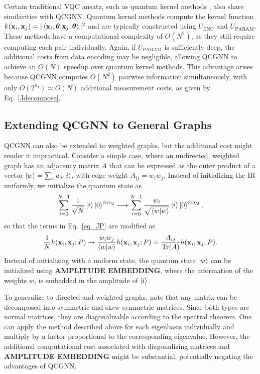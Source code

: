 \documentclass[reprint,amsmath,amssymb,prd,nofootinbib]{revtex4-2}
\DeclareMathOperator{\Tr}{Tr}
\def\xbf{\mathbf{x}}
\def\thetabf{\boldsymbol{\theta}}
\def\UENC{U_{\text{ENC}}}
\def\UPARAM{U_{\text{PARAM}}}
\begin{document}
Certain traditional VQC ansatz, such as quantum kernel methods \cite{q_kernel1,q_kernel2}, also share similarities with QCGNN. Quantum kernel methods compute the kernel function $k(\xbf_i, \xbf_j)=|\braket{\xbf_i, \thetabf|\xbf_j, \thetabf}|^2$ and are typically constructed using $\UENC$ and $\UPARAM$. These methods have a computational complexity of $O(N^2)$, as they still require computing each pair individually. Again, if $\UPARAM$ is sufficiently deep, the additional costs from data encoding may be negligible, allowing QCGNN to achieve an $O(N)$ speedup over quantum kernel methods. This advantage arises because QCGNN computes $O(N^2)$ pairwise information simultaneously, with only $O(2^{n_I}) \approx O(N)$ additional measurement costs, as given by Eq.~\ref{Jdecompose}.

\subsection{Extending QCGNN to General Graphs}

QCGNN can also be extended to weighted graphs, but the additional cost might render it impractical. Consider a simple case, where an undirected, weighted graph has an adjacency matrix $A$ that can be expressed as the outer product of a vector $\ket{w}=\sum_i w_i\ket{i}$, with edge weight $A_{ij}=w_iw_j$. Instead of initializing the IR uniformly, we initialize the quantum state as
\begin{equation*}
    \sum^{N-1}_{i=0}\frac{1}{\sqrt{N}}\ket{i}\ket{0}^{\otimes n_Q}
    \longrightarrow
    \sum^{N-1}_{i=0}\frac{w_i}{\sqrt{\braket{w|w}}}\ket{i}\ket{0}^{\otimes n_Q},
\end{equation*}
so that the terms in Eq.~\ref{eq_JP} are modified as
\begin{equation*}
    \frac{1}{N} h(\xbf_i, \xbf_j; P)
    \rightarrow
    \frac{w_iw_j}{\braket{w|w}}h(\xbf_i, \xbf_j; P)
    =
    \frac{A_{ij}}{\Tr(A)}h(\xbf_i, \xbf_j; P).
\end{equation*}
Instead of initializing with a uniform state, the quantum state $\ket{w}$ can be initialized using \textbf{AMPLITUDE EMBEDDING}, where the information of the weights $w_i$ is embedded in the amplitude of $\ket{i}$.

To generalize to directed and weighted graphs, note that any matrix can be decomposed into symmetric and skew-symmetric matrices. Since both types are normal matrices, they are diagonalizable according to the spectral theorem. One can apply the method described above for each eigenbasis individually and multiply by a factor proportional to the corresponding eigenvalue. However, the additional computational cost associated with diagonalizing matrices and \textbf{AMPLITUDE EMBEDDING} might be substantial, potentially negating the advantages of QCGNN.
\end{document}
